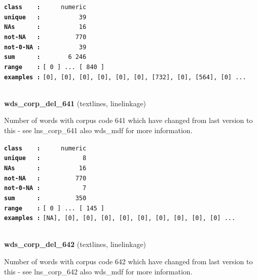 \documentclass[]{article}
\begin{document}
\textbf{\texttt{class\ \ \ \ :}} \texttt{~~~~~numeric}\\
\textbf{\texttt{unique\ \ \ :}} \texttt{~~~~~~~~~~39}\\
\textbf{\texttt{NAs\ \ \ \ \ \ :}} \texttt{~~~~~~~~~~16}\\
\textbf{\texttt{not-NA\ \ \ :}} \texttt{~~~~~~~~~770}\\
\textbf{\texttt{not-0-NA\ :}} \texttt{~~~~~~~~~~39}\\
\textbf{\texttt{sum\ \ \ \ \ \ :}} \texttt{~~~~~~~6~246}\\
\textbf{\texttt{range\ \ \ \ :}}
\texttt{{[}\ 0\ {]}\ ...\ {[}\ 840\ {]}}\\
\textbf{\texttt{examples\ :}}
\texttt{{[}0{]},\ {[}0{]},\ {[}0{]},\ {[}0{]},\ {[}0{]},\ {[}0{]},\ {[}732{]},\ {[}0{]},\ {[}564{]},\ {[}0{]}\ ...}\\

~

\textbf{wds\_corp\_del\_641} (textlines, linelinkage)

Number of words with corpus code 641 which have changed from last
version to this - see lns\_corp\_641 also wds\_mdf for more information.

\textbf{\texttt{class\ \ \ \ :}} \texttt{~~~~~numeric}\\
\textbf{\texttt{unique\ \ \ :}} \texttt{~~~~~~~~~~~8}\\
\textbf{\texttt{NAs\ \ \ \ \ \ :}} \texttt{~~~~~~~~~~16}\\
\textbf{\texttt{not-NA\ \ \ :}} \texttt{~~~~~~~~~770}\\
\textbf{\texttt{not-0-NA\ :}} \texttt{~~~~~~~~~~~7}\\
\textbf{\texttt{sum\ \ \ \ \ \ :}} \texttt{~~~~~~~~~350}\\
\textbf{\texttt{range\ \ \ \ :}}
\texttt{{[}\ 0\ {]}\ ...\ {[}\ 145\ {]}}\\
\textbf{\texttt{examples\ :}}
\texttt{{[}NA{]},\ {[}0{]},\ {[}0{]},\ {[}0{]},\ {[}0{]},\ {[}0{]},\ {[}0{]},\ {[}0{]},\ {[}0{]},\ {[}0{]}\ ...}\\

~

\textbf{wds\_corp\_del\_642} (textlines, linelinkage)

Number of words with corpus code 642 which have changed from last
version to this - see lns\_corp\_642 also wds\_mdf for more information.
\end{document}
